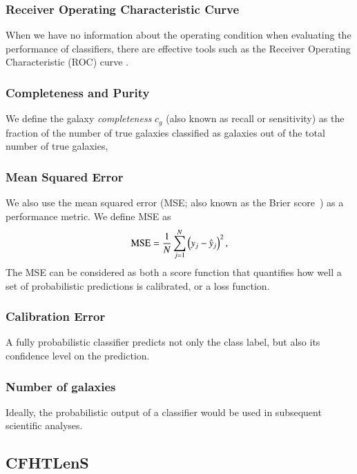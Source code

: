 \documentclass[fleqn,usenatbib]{mnras}
\begin{document}
\subsubsection{Receiver Operating Characteristic Curve}

When we have no information about the operating condition
when evaluating the performance of classifiers,
there are effective tools such as
the Receiver Operating Characteristic (ROC) curve
\citep*{swets2000better}.

\subsubsection{Completeness and Purity}

We define the galaxy \textit{completeness}
$c_g$ (also known as recall or sensitivity) as
the fraction of the number of true galaxies classified as galaxies
out of the total number of true galaxies,

\subsubsection{Mean Squared Error}

We also use the mean squared error
(MSE; also known as the Brier score~\citep{brier1950verification})
as a performance metric. We define MSE as
\begin{equation} \label{eq:mse}
  {\mathrm{MSE}} = \frac{1}{N} \sum^{N}_{j=1}
  \left( y_j - \hat{y}_j \right)^2,
\end{equation}
The MSE can be considered as both a score function that quantifies
how well a set of probabilistic predictions is calibrated,
or a loss function.

\subsubsection{Calibration Error}

A fully probabilistic classifier predicts not only the class label,
but also its confidence level on the prediction.

\subsubsection{Number of galaxies}

Ideally, the probabilistic output of a classifier would be used in subsequent
scientific analyses.

\subsection{CFHTLenS}
  \label{sec:results_cfht}
\end{document}
